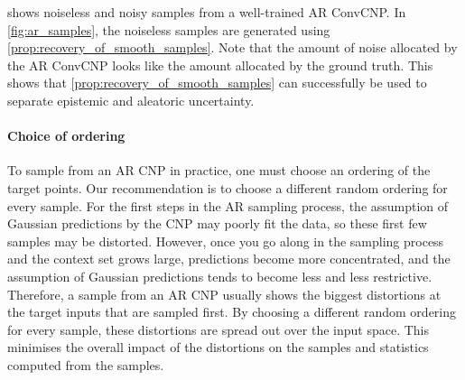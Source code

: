 \documentclass[12pt]{report}
\begin{document}
 shows noiseless and noisy samples from a well-trained AR ConvCNP.
In \cref{fig:ar_samples}, the noiseless samples are generated using \cref{prop:recovery_of_smooth_samples}.
Note that the amount of noise allocated by the AR ConvCNP looks like the amount allocated by the ground truth.
This shows that \cref{prop:recovery_of_smooth_samples} can successfully be used to separate epistemic and aleatoric uncertainty.

\paragraph{Choice of ordering}
To sample from an AR CNP in practice, one must choose an ordering of the target points.
Our recommendation is to choose a different random ordering for every sample.
For the first steps in the AR sampling process, the assumption of Gaussian predictions by the CNP may poorly fit the data, so these first few samples may be distorted.
However, once you go along in the sampling process and the context set grows large, predictions become more concentrated, and the assumption of Gaussian predictions tends to become less and less restrictive. 
Therefore, a sample from an AR CNP usually shows the biggest distortions at the target inputs that are sampled first.
By choosing a different random ordering for every sample, these distortions are spread out over the input space.
This minimises the overall impact of the distortions on the samples and statistics computed from the samples.
\end{document}
